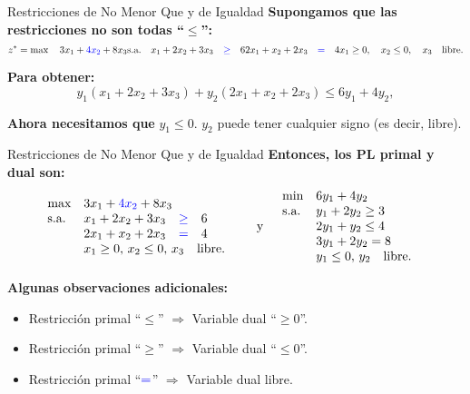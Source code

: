 \documentclass{beamer}
\begin{document}
\begin{frame}{Restricciones de No Menor Que y de Igualdad}
    \textbf{Supongamos que las restricciones no son todas “\(\leq\)”:}
    \[
    z^* = \max \quad 3x_1 + \textcolor{blue}{4x_2} + 8x_3 \\
    \text{s.a.} \quad x_1 + 2x_2 + 3x_3 \quad \text{\textcolor{blue}{$\geq$}} \quad 6 \\
    2x_1 + x_2 + 2x_3 \quad \text{\textcolor{blue}{$=$}} \quad 4 \\
    x_1 \geq 0, \quad x_2 \leq 0, \quad x_3 \quad \text{libre}.
    \]

    \vspace{0.3cm}
    \textbf{Para obtener:}
    \[
    y_1(x_1 + 2x_2 + 3x_3) + y_2(2x_1 + x_2 + 2x_3) \leq 6y_1 + 4y_2,
    \]

    \vspace{0.3cm}
    \textbf{Ahora necesitamos que} \( y_1 \leq 0 \). \( y_2 \) puede tener cualquier signo (es decir, libre).
\end{frame}

\begin{frame}{Restricciones de No Menor Que y de Igualdad}
    \textbf{Entonces, los PL primal y dual son:}
    \[
    \begin{array}{lll}
    \text{max} & 3x_1 + \textcolor{blue}{4x_2} + 8x_3 & \\
    \text{s.a.} & x_1 + 2x_2 + 3x_3 \quad \text{\textcolor{blue}{$\geq$}} \quad 6 & \\
    & 2x_1 + x_2 + 2x_3 \quad \text{\textcolor{blue}{$=$}} \quad 4 & \\
    & x_1 \geq 0, \, x_2 \leq 0, \, x_3 \quad \text{libre}. &
    \end{array}
    \quad \text{y} \quad
    \begin{array}{lll}
    \text{min} & 6y_1 + 4y_2 & \\
    \text{s.a.} & y_1 + 2y_2 \geq 3 & \\
    & 2y_1 + y_2 \leq 4 & \\
    & 3y_1 + 2y_2 = 8 & \\
    & y_1 \leq 0, \, y_2 \quad \text{libre}. &
    \end{array}
    \]

    \vspace{0.3cm}
    \textbf{Algunas observaciones adicionales:}
    \begin{itemize}
        \item Restricción primal “\(\leq\)” \(\Rightarrow\) Variable dual “\(\geq 0\)”.
        \item Restricción primal “\(\geq\)” \(\Rightarrow\) Variable dual “\(\leq 0\)”.
        \item Restricción primal “\(\textcolor{blue}{=}\)” \(\Rightarrow\) Variable dual libre.
    \end{itemize}
\end{frame}
\end{document}
